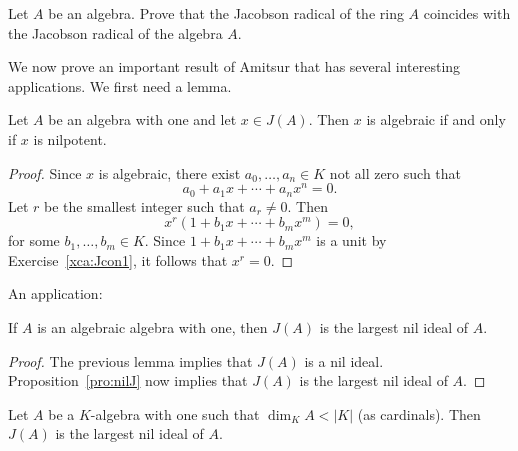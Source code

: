 \begin{exercise}
    Let $A$ be an algebra. Prove that the Jacobson
    radical of the ring $A$ coincides with the Jacobson radical of the algebra $A$. 
\end{exercise}



We now prove an important result of Amitsur that
has several interesting applications. We first need a lemma. 

\begin{lemma}
	\label{lemma:algebraico=nil}
	Let $A$ be an algebra with one and let $x\in J(A)$. 
	Then $x$ is algebraic if and only if $x$ is nilpotent. 
\end{lemma}

\begin{proof}
    Since $x$ is algebraic, there exist $a_0,\dots,a_n\in K$ 
    not all zero such that 
    \[
		a_0+a_1x+\cdots+a_nx^n=0.
	\]
	Let $r$ be the smallest integer such that $a_r\ne 0$. Then 
	\[
		x^r(1+b_1x+\cdots+b_mx^m)=0,
	\]
	for some $b_1,\dots,b_m\in K$. Since $1+b_1x+\cdots+b_mx^m$ is a unit by 
	Exercise~\ref{xca:Jcon1}, it follows that $x^r=0$.
\end{proof}

An application:

\begin{proposition}
	\label{pro:algebraica=>Jnil}
	If $A$ is an algebraic algebra with one, then $J(A)$ is the largest nil ideal of $A$.
\end{proposition}

\begin{proof}
	The previous lemma implies that $J(A)$ is a nil ideal. 
	Proposition~\ref{pro:nilJ} now implies that $J(A)$ is the largest nil ideal of $A$. 
\end{proof}

\begin{theorem}[Amitsur]
	\label{thm:Amitsur}
	Let $A$ be a $K$-algebra with one such that $\dim_KA<|K|$ (as cardinals). Then 
	$J(A)$ is the largest nil ideal of $A$. 
\end{theorem}

